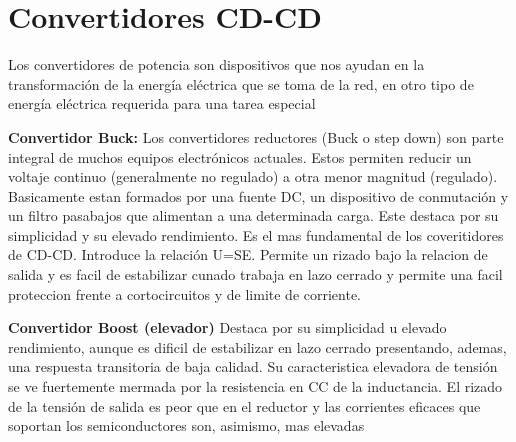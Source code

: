 \documentclass[08pt]{article}
\begin{document}
\section{Convertidores CD-CD} 

Los convertidores de potencia son dispositivos que nos ayudan en la transformación de la energía eléctrica que se toma de la red, en otro tipo de energía eléctrica requerida para una tarea especial

\textbf{Convertidor Buck:} Los convertidores reductores (Buck o step down) son parte integral de muchos equipos electrónicos actuales. Estos permiten reducir un voltaje continuo (generalmente no regulado) a otra menor magnitud (regulado). Basicamente estan formados por una fuente DC, un dispositivo de conmutación y un filtro pasabajos que alimentan a una determinada carga.
Este destaca por su simplicidad y su elevado rendimiento. Es el mas fundamental de los coveritidores de CD-CD. Introduce la relación U=SE. Permite un rizado bajo la relacion de salida y es facil de estabilizar cunado trabaja en lazo cerrado y permite una facil proteccion frente a cortocircuitos y de limite de corriente.

\textbf{Convertidor Boost (elevador)} Destaca por su simplicidad u elevado rendimiento, aunque es dificil de  estabilizar en lazo cerrado presentando, ademas, una respuesta transitoria de baja calidad. Su caracteristica elevadora de tensión se ve fuertemente mermada por la resistencia en CC de la inductancia. El rizado de la tensión de salida es peor que en el reductor y las corrientes eficaces que soportan los semiconductores son, asimismo, mas elevadas
\end{document}

